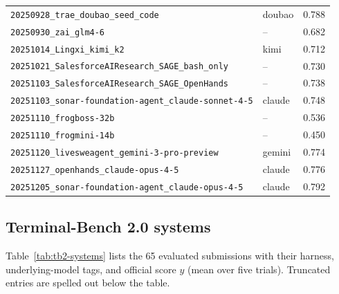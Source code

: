 \begin{center}
\begin{longtable}{llc}
\texttt{20250928\_trae\_doubao\_seed\_code} & doubao & 0.788 \\
\texttt{20250930\_zai\_glm4-6} & -- & 0.682 \\
\texttt{20251014\_Lingxi\_kimi\_k2} & kimi & 0.712 \\
\texttt{20251021\_SalesforceAIResearch\_SAGE\_bash\_only} & -- & 0.730 \\
\texttt{20251103\_SalesforceAIResearch\_SAGE\_OpenHands} & -- & 0.738 \\
\texttt{20251103\_sonar-foundation-agent\_claude-sonnet-4-5} & claude & 0.748 \\
\texttt{20251110\_frogboss-32b} & -- & 0.536 \\
\texttt{20251110\_frogmini-14b} & -- & 0.450 \\
\texttt{20251120\_livesweagent\_gemini-3-pro-preview} & gemini & 0.774 \\
\texttt{20251127\_openhands\_claude-opus-4-5} & claude & 0.776 \\
\texttt{20251205\_sonar-foundation-agent\_claude-opus-4-5} & claude & 0.792 \\
\end{longtable}
\end{center}

\clearpage
\subsection{Terminal-Bench 2.0 systems}
Table~\ref{tab:tb2-systems} lists the 65 evaluated submissions with their harness, underlying-model tags, and official score $y$ (mean over five trials). Truncated entries are spelled out below the table.

